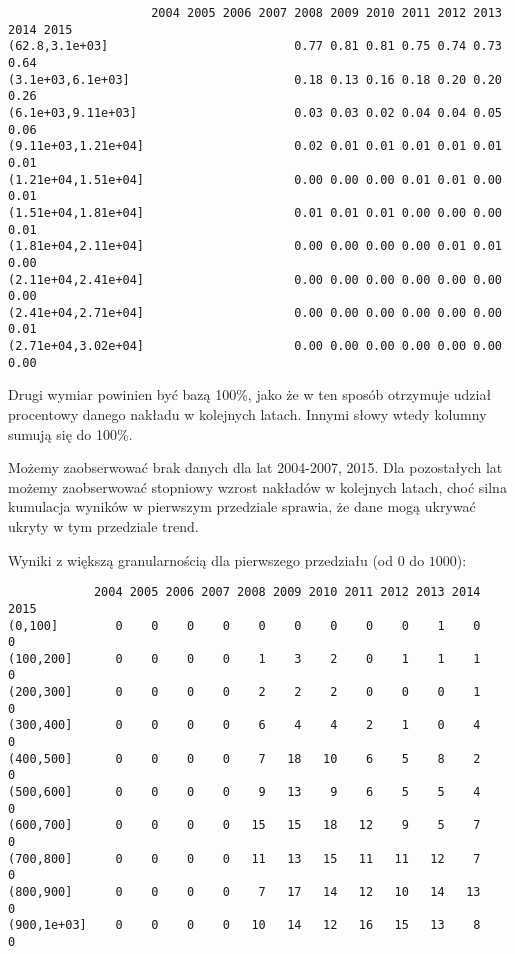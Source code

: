 \begin{verbatim}
                    2004 2005 2006 2007 2008 2009 2010 2011 2012 2013 2014 2015
(62.8,3.1e+03]                          0.77 0.81 0.81 0.75 0.74 0.73 0.64     
(3.1e+03,6.1e+03]                       0.18 0.13 0.16 0.18 0.20 0.20 0.26     
(6.1e+03,9.11e+03]                      0.03 0.03 0.02 0.04 0.04 0.05 0.06     
(9.11e+03,1.21e+04]                     0.02 0.01 0.01 0.01 0.01 0.01 0.01     
(1.21e+04,1.51e+04]                     0.00 0.00 0.00 0.01 0.01 0.00 0.01     
(1.51e+04,1.81e+04]                     0.01 0.01 0.01 0.00 0.00 0.00 0.01     
(1.81e+04,2.11e+04]                     0.00 0.00 0.00 0.00 0.01 0.01 0.00     
(2.11e+04,2.41e+04]                     0.00 0.00 0.00 0.00 0.00 0.00 0.00     
(2.41e+04,2.71e+04]                     0.00 0.00 0.00 0.00 0.00 0.00 0.01     
(2.71e+04,3.02e+04]                     0.00 0.00 0.00 0.00 0.00 0.00 0.00       
\end{verbatim}

Drugi wymiar powinien być bazą 100\%, jako że w ten sposób otrzymuje udział procentowy
danego nakładu w kolejnych latach. Innymi słowy wtedy kolumny sumują się do 100\%.

Możemy zaobserwować brak danych dla lat 2004-2007, 2015.
Dla pozostałych lat możemy zaobserwować stopniowy wzrost nakładów w kolejnych latach, choć
silna kumulacja wyników w pierwszym przedziale sprawia, że dane mogą ukrywać ukryty w tym przedziale trend.

Wyniki z większą granularnością dla pierwszego przedziału (od $0$ do $1000$):

\begin{verbatim}
            2004 2005 2006 2007 2008 2009 2010 2011 2012 2013 2014 2015
(0,100]        0    0    0    0    0    0    0    0    0    1    0    0
(100,200]      0    0    0    0    1    3    2    0    1    1    1    0
(200,300]      0    0    0    0    2    2    2    0    0    0    1    0
(300,400]      0    0    0    0    6    4    4    2    1    0    4    0
(400,500]      0    0    0    0    7   18   10    6    5    8    2    0
(500,600]      0    0    0    0    9   13    9    6    5    5    4    0
(600,700]      0    0    0    0   15   15   18   12    9    5    7    0
(700,800]      0    0    0    0   11   13   15   11   11   12    7    0
(800,900]      0    0    0    0    7   17   14   12   10   14   13    0
(900,1e+03]    0    0    0    0   10   14   12   16   15   13    8    0
\end{verbatim}

